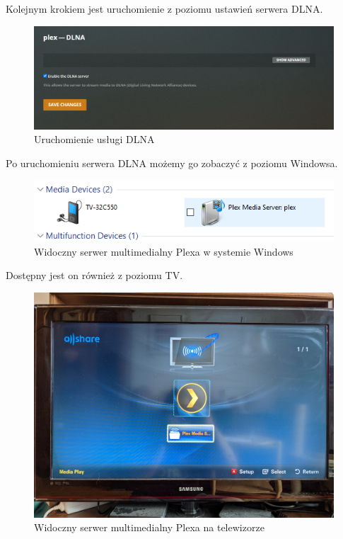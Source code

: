 \documentclass[12pt,a4paper]{article}
\newcommand{\<}{\langle}
\renewcommand{\>}{\rangle}
\theoremstyle{definition}
\begin{document}
Kolejnym krokiem jest uruchomienie z poziomu ustawień serwera DLNA.

\begin{figure}[H]
    \centering
    \includegraphics[width=\linewidth]{img/ss_plex/25.png}
    \caption{Uruchomienie usługi DLNA}
\end{figure}

Po uruchomieniu serwera DLNA możemy go zobaczyć z poziomu Windowsa.

\begin{figure}[H]
    \centering
    \includegraphics{img/ss_plex/27.png}
    \caption{Widoczny serwer multimedialny Plexa w systemie Windows}
\end{figure}

Dostępny jest on również z poziomu TV.

\begin{figure}[H]
    \centering
    \includegraphics[width=13cm]{img/ss_plex/tv2.jpg}
    \caption{Widoczny serwer multimedialny Plexa na telewizorze}
\end{figure}
\end{document}
